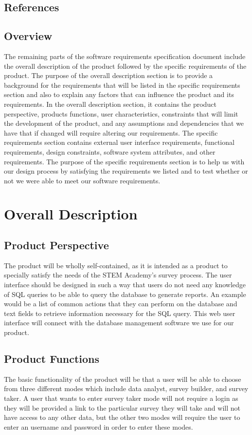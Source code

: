 \documentclass[letterpaper,10pt,serif, draftclsnofoot,onecolumn, compsoc, titlepage]{IEEEtran}
\begin{document}
\subsection{References}
\subsection{Overview}
The remaining parts of the software requirements specification document include the overall description of the product followed by the specific requirements of the product.
 The purpose of the overall description section is to provide a background for the requirements that will be listed in the specific requirements section and also to explain any factors that can influence the product and its requirements. 
 In the overall description section, it contains the product perspective, products functions, user characteristics, constraints that will limit the development of the product, and any assumptions and dependencies that we have that if changed will require altering our requirements. 
The specific requirements section contains external user interface requirements, functional requirements, design constraints, software system attributes, and other requirements. 
The purpose of the specific requirements section is to help us with our design process by satisfying the requirements we listed and to test whether or not we were able to meet our software requirements.  
\section{Overall Description}

\subsection{Product Perspective}
The product will be wholly self-contained, as it is intended as a product to specially satisfy the needs of the STEM Academy's survey
process. The user interface should be designed in such a way that users do not need any knowledge of SQL queries to be able
to query the database to generate reports. An example would be a list of common actions that they can perform on the database
and text fields to retrieve information necessary for the SQL query. This web user interface will connect with the database management
software we use for our product.
\subsection{Product Functions}
The basic functionality of the product will be that a user will be able to choose from three different modes which include data analyst, survey builder, and survey taker. 
A user that wants to enter survey taker mode will not require a login as they will be provided a link to the particular survey they will take and will not have access to any other data, but the other two modes will require the user to enter an username and password in order to enter these modes. 
\end{document}
